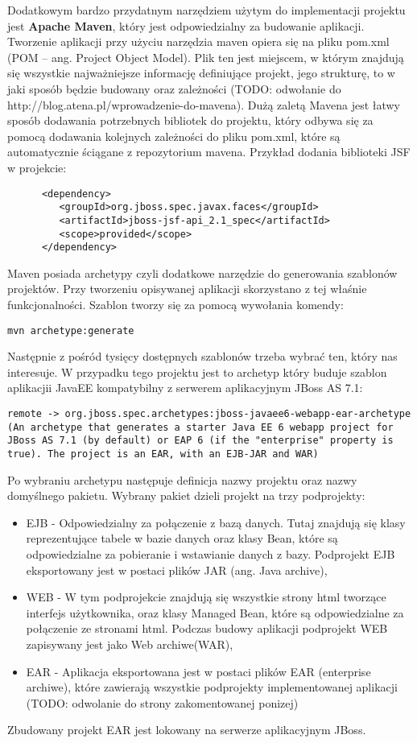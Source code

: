 Dodatkowym bardzo przydatnym narzędziem użytym do implementacji projektu jest \textbf{Apache Maven}, który jest odpowiedzialny za budowanie aplikacji. Tworzenie aplikacji przy użyciu narzędzia maven opiera się na pliku pom.xml (POM – ang. Project Object Model). Plik ten jest miejscem, w którym znajdują się wszystkie najważniejsze informację definiujące projekt, jego strukturę, to w jaki sposób będzie budowany oraz zależności (TODO: odwołanie do http://blog.atena.pl/wprowadzenie-do-mavena). Dużą zaletą Mavena jest łatwy sposób dodawania potrzebnych bibliotek do projektu, który odbywa się za pomocą dodawania kolejnych zależności do pliku pom.xml, które są automatycznie ściągane z repozytorium mavena. Przykład dodania biblioteki JSF w projekcie:
\begin{lstlisting}
      <dependency>
         <groupId>org.jboss.spec.javax.faces</groupId>
         <artifactId>jboss-jsf-api_2.1_spec</artifactId>
         <scope>provided</scope>
      </dependency>
\end{lstlisting}
Maven posiada archetypy czyli dodatkowe narzędzie do generowania szablonów projektów. Przy tworzeniu opisywanej aplikacji skorzystano z tej właśnie funkcjonalności. Szablon tworzy się za pomocą wywołania komendy:
\begin{lstlisting}
mvn archetype:generate 
\end{lstlisting}
Następnie z pośród tysięcy dostępnych szablonów trzeba wybrać ten, który nas interesuje. W przypadku tego projektu jest to archetyp który buduje szablon aplikacjii JavaEE kompatybilny z serwerem aplikacyjnym JBoss AS 7.1:
\begin{lstlisting}[breaklines=true]
remote -> org.jboss.spec.archetypes:jboss-javaee6-webapp-ear-archetype (An archetype that generates a starter Java EE 6 webapp project for JBoss AS 7.1 (by default) or EAP 6 (if the "enterprise" property is true). The project is an EAR, with an EJB-JAR and WAR)
\end{lstlisting}
Po wybraniu archetypu następuje definicja nazwy projektu oraz nazwy domyślnego pakietu. Wybrany pakiet dzieli projekt na trzy podprojekty: 
\begin{itemize}
	\item EJB - Odpowiedzialny za połączenie z bazą danych. Tutaj znajdują się klasy reprezentujące tabele w bazie danych oraz klasy Bean, które są odpowiedzialne za pobieranie i wstawianie danych z bazy. Podprojekt EJB eksportowany jest w postaci plików JAR (ang. Java archive),
	\item WEB - W tym podprojekcie znajdują się wszystkie strony html tworzące interfejs użytkownika, oraz klasy Managed Bean, które są odpowiedzialne za połączenie ze stronami html. Podczas budowy aplikacji podprojekt WEB zapisywany jest jako Web archiwe(WAR),
	\item EAR - Aplikacja eksportowana jest w postaci plików EAR (enterprise archiwe), które zawierają wszystkie podprojekty implementowanej aplikacji (TODO: odwolanie do strony zakomentowanej ponizej)
\end{itemize}
Zbudowany projekt EAR jest lokowany na serwerze aplikacyjnym JBoss.\newline

